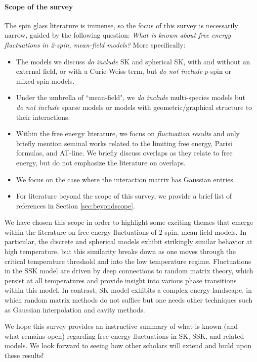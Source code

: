 \documentclass[11pt]{article}
\numberwithin{equation}{section}
\theoremstyle{remark}
\begin{document}
\paragraph{Scope of the survey}
The spin glass literature is immense, so the focus of this survey is necessarily narrow, guided by the following question:
\textit{What is known about free energy fluctuations in 2-spin, mean-field models?}
More specifically:
\begin{itemize}
\item The models we discuss \textit{do include} SK and spherical SK, with and without an external field, or with a Curie-Weiss term, but \textit{do not include} $p$-spin or mixed-spin models.
\item Under the umbrella of ``mean-field", we \textit{do include} multi-species models but \textit{do not include} sparse models or models with geometric/graphical structure to their interactions.
\item Within the free energy literature, we focus on \textit{fluctuation results} and only briefly mention seminal works related to the limiting free energy, Parisi formulas, and AT-line.  We briefly discuss overlaps as they relate to free energy, but do not emphasize the literature on overlaps.
\item We focus on the case where the interaction matrix has Gaussian entries.
\item For literature beyond the scope of this survey, we provide a brief list of references in Section \ref{sec:beyondscope}.
\end{itemize}
We have chosen this scope in order to highlight some exciting themes that emerge within the literature on free energy fluctuations of 2-spin, mean field models.  In particular, the discrete and spherical models exhibit strikingly similar behavior at high temperature, but this similarity breaks down as one moves through the critical temperature threshold and into the low temperature regime.  Fluctuations in the SSK model are driven by deep connections to random matrix theory, which persist at all temperatures and provide insight into various phase transitions within this model. In contrast, SK model exhibits a complex energy landscape, in which random matrix methods do not suffice but one needs other techniques such as Gaussian interpolation and cavity methods.

We hope this survey provides an instructive summary of what is known (and what remains open) regarding free energy fluctuations in SK, SSK, and related models.  We look forward to seeing how other scholars will extend and build upon these results!
\end{document}
